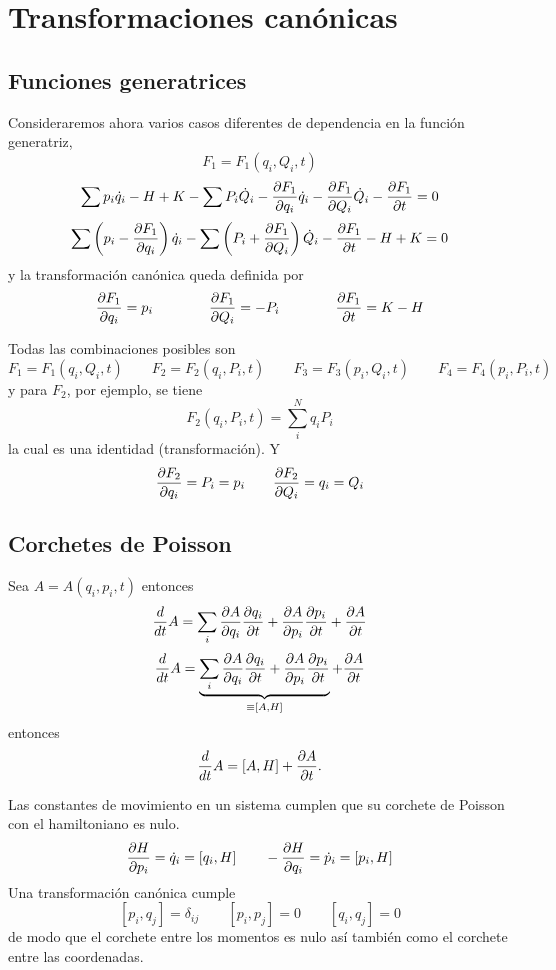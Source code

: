 \documentclass[10pt,oneside]{CBFT_book}
\begin{document}
\chapter{Transformaciones canónicas}

\section{Funciones generatrices}

Consideraremos ahora varios casos diferentes de dependencia en la función generatriz,
\[
	F_1 = F_1(q_i,Q_i,t)
\]
\[
	\sum p_i \dot{q}_i - H + K - \sum P_i \dot{Q}_i - \dpar{F_1}{q_i} \dot{q}_i - \dpar{F_1}{Q_i} \dot{Q}_i -
	\dpar{F_1}{t} = 0 
\]
\[
	\sum \left( p_i - \dpar{F_1}{q_i} \right) \dot{q}_i  - \sum \left( P_i + \dpar{F_1}{Q_i} \right) \dot{Q}_i -
	\dpar{F_1}{t} - H + K = 0 
\]
y la transformación canónica queda definida por 
\[
	\dpar{F_1}{q_i} = p_i \qquad \qquad \dpar{F_1}{Q_i} = - P_i \qquad \qquad \dpar{F_1}{t} = K-H
\]

Todas las combinaciones posibles son 
\[
	F_1 = F_1(q_i,Q_i,t) \qquad 
	F_2 = F_2(q_i,P_i,t) \qquad 
	F_3 = F_3(p_i,Q_i,t) \qquad 
	F_4 = F_4(p_i,P_i,t)
\]
y para $F_2$, por ejemplo, se tiene 
\[
	F_2(q_i,P_i,t) = \sum_i^N q_i P_i
\]
la cual es una identidad (transformación). Y
\[
	\dpar{F_2}{q_i} = P_i = p_i \qquad \dpar{F_2}{Q_i} = q_i = Q_i
\]

\section{Corchetes de Poisson}

Sea $A=A(q_i,p_i,t)$ entonces
\[
	\frac{d}{dt}A = \sum_i \dpar{A}{q_i} \dpar{q_i}{t} + \dpar{A}{p_i} \dpar{p_i}{t} + \dpar{A}{t}
\]
\[
	\frac{d}{dt}A = \underbrace{\sum_i \dpar{A}{q_i} \dpar{q_i}{t} + \dpar{A}{p_i} \dpar{p_i}{t}}_{\equiv [A,H]} + 
\dpar{A}{t}
\]
entonces
\[
	\frac{d}{dt}A = [A,H] + \dpar{A}{t}.
\]

Las constantes de movimiento en un sistema cumplen que su corchete de Poisson con el hamiltoniano es nulo.
\[
	\dpar{H}{p_i} = \dot{q}_i = [q_i,H] \qquad  -\dpar{H}{q_i} = \dot{p}_i = [p_i,H]
\]
Una transformación canónica cumple 
\[
	[p_i,q_j] = \delta_{ij} \qquad [p_i,p_j] = 0 \qquad [q_i,q_j] = 0
\]
de modo que el corchete entre los momentos es nulo así también como el corchete entre las coordenadas.









\end{document}
